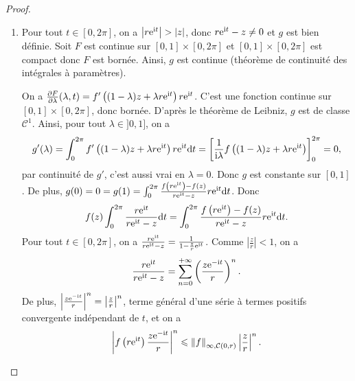 \documentclass[12pt]{article}
\begin{document}
\begin{proof}
    \phantom{}
    \begin{enumerate}
        \item Pour tout $t\in[0,2\pi]$, on a $\left\lvert r\mathrm{e}^{\mathrm{i} t}\right\rvert>\left\lvert z\right\rvert$, donc $r\mathrm{e}^{\mathrm{i} t}-z\neq0$ et $g$ est bien définie. Soit 
        $F$ est continue sur $[0,1]\times[0,2\pi]$ et $[0,1]\times[0,2\pi]$ est compact donc $F$ est bornée. Ainsi, $g$ est continue (théorème de continuité des intégrales à paramètres). 

        On a $\frac{\partial F}{\partial \lambda}(\lambda,t)=f'\left((1-\lambda)z+\lambda r\mathrm{e}^{\mathrm{i} t}\right)r\mathrm{e}^{\mathrm{i} t}$. C'est une fonction continue sur $[0,1]\times[0,2\pi]$, donc bornée. D'après le théorème de Leibniz, $g$ est de classe $\mathcal{C}^{1}$. Ainsi, pour tout $\lambda\in]0,1]$, on a 
        \begin{equation}
            g'(\lambda)=\int_{0}^{2\pi}f'\left((1-\lambda)z+\lambda r\mathrm{e}^{\mathrm{i} t}\right)r\mathrm{e}^{\mathrm{i} t}\mathrm{d} t=\left[\frac{1}{\mathrm{i}\lambda}f\left((1-\lambda)z+\lambda r\mathrm{e}^{\mathrm{i} t}\right)\right]_{0}^{2\pi}=0,
        \end{equation}
        par continuité de $g'$, c'est aussi vrai en $\lambda=0$. Donc $g$ est constante sur $[0,1]$. De plus, $g(0)=0=g(1)=\int_{0}^{2\pi}\frac{f\left(r\mathrm{e}^{\mathrm{i} t}\right)-f(z)}{r\mathrm{e}^{\mathrm{i} t}-z}r\mathrm{e}^{\mathrm{i} t}\mathrm{d} t$. Donc 
        \begin{equation}
            f(z)\int_{0}^{2\pi}\frac{r\mathrm{e}^{\mathrm{i} t}}{r\mathrm{e}^{\mathrm{i} t}-z}\mathrm{d} t=\int_{0}^{2\pi}\frac{f\left(r\mathrm{e}^{\mathrm{i} t}\right)-f(z)}{r\mathrm{e}^{\mathrm{i} t}-z}r\mathrm{e}^{\mathrm{i} t}\mathrm{d} t.
        \end{equation}
        Pour tout $t\in[0,2\pi]$, on a $\frac{r\mathrm{e}^{\mathrm{i} t}}{r\mathrm{e}^{\mathrm{i} t}-z}=\frac{1}{1-\frac{z}{r}\mathrm{e}^{\mathrm{i} t}}$. Comme $\left\lvert\frac{z}{r}\right\rvert<1$, on a 
        \begin{equation}
            \frac{r\mathrm{e}^{\mathrm{i} t}}{r\mathrm{e}^{\mathrm{i} t}-z}=\sum_{n=0}^{+\infty}\left(\frac{z\mathrm{e}^{-\mathrm{i} t}}{r}\right)^{n}.
        \end{equation}
        De plus, $\left\lvert \frac{z\mathrm{e}^{-\mathrm{i} t}}{r}\right\rvert^{n}=\left\lvert\frac{z}{r}\right\rvert^{n}$, terme général d'une série à termes positifs convergente indépendant de $t$, et on a 
        \begin{equation}
            \left\lvert f\left(r\mathrm{e}^{\mathrm{i} t}\right)\frac{z\mathrm{e}^{-\mathrm{i} t}}{r}\right\rvert^{n}\leqslant\left\lVert f\right\rVert_{\infty,\mathcal{C}(0,r)}\left\lvert\frac{z}{r}\right\rvert^{n}.
        \end{equation}


\end{enumerate}
\end{proof}
\end{document}
